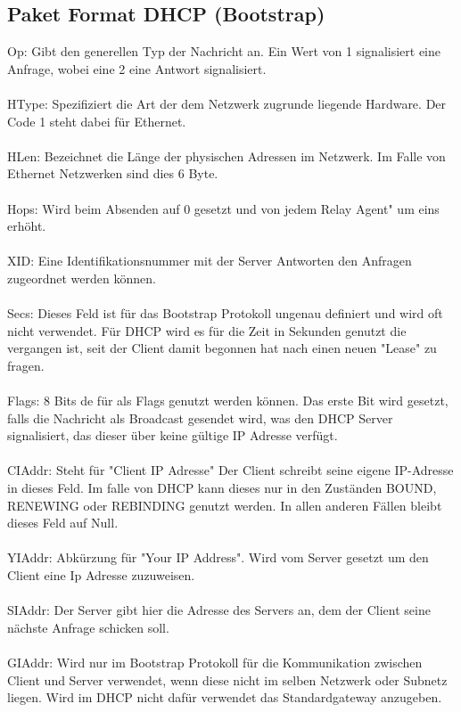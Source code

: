 \subsection{Paket Format DHCP (Bootstrap)}
Op: Gibt den generellen Typ der Nachricht an. Ein Wert von 1 signalisiert eine Anfrage, wobei eine 2 eine Antwort signalisiert. \\\\
HType: Spezifiziert die Art der dem Netzwerk zugrunde liegende Hardware. Der Code 1 steht dabei für Ethernet. \\\\
HLen: Bezeichnet die Länge der physischen Adressen im Netzwerk. Im Falle von Ethernet Netzwerken sind dies 6 Byte. \\\\
Hops: Wird beim Absenden auf 0 gesetzt und von jedem Relay Agent" um eins erhöht. \\\\
XID: Eine Identifikationsnummer mit der Server Antworten den Anfragen zugeordnet werden können. \\\\
Secs: Dieses Feld ist für das Bootstrap Protokoll ungenau definiert und wird oft nicht verwendet. Für DHCP wird es für die Zeit in Sekunden genutzt die vergangen ist, seit der Client damit begonnen hat nach einen neuen "Lease" zu fragen. \\\\
Flags: 8 Bits de für als Flags genutzt werden können. Das erste Bit wird gesetzt, falls die Nachricht als Broadcast gesendet wird, was den DHCP Server signalisiert, das dieser über keine gültige IP Adresse verfügt. \\\\
CIAddr: Steht für "Client IP Adresse" Der Client schreibt seine eigene IP-Adresse in dieses Feld. Im falle von DHCP kann dieses nur in den Zuständen BOUND, RENEWING oder REBINDING genutzt werden. In allen anderen Fällen bleibt dieses Feld auf Null. \\\\
YIAddr: Abkürzung für "Your IP Address". Wird vom Server gesetzt um den Client eine Ip Adresse zuzuweisen. \\\\
SIAddr: Der Server gibt hier die Adresse des Servers an, dem der Client seine nächste Anfrage schicken soll. \\\\
GIAddr: Wird nur im Bootstrap Protokoll für die Kommunikation zwischen Client und Server verwendet, wenn diese nicht im selben Netzwerk oder Subnetz liegen. Wird im DHCP nicht dafür verwendet das Standardgateway anzugeben. \\\\
